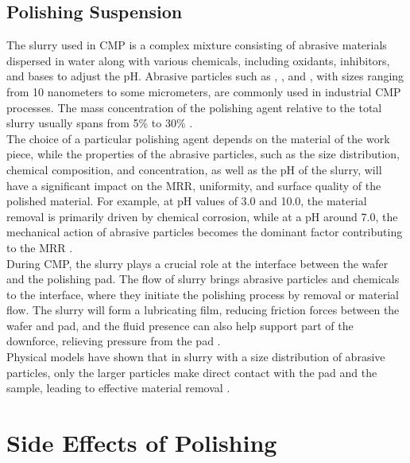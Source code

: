 \subsection{Polishing Suspension}
\label{subsec:polishing_slurry}

The slurry used in CMP is a complex mixture consisting of abrasive materials dispersed in water along with various chemicals, including oxidants, inhibitors, and bases to adjust the pH. Abrasive particles such as , , and , with sizes ranging from 10 nanometers to some micrometers, are commonly used in industrial CMP processes. The mass concentration of the polishing agent relative to the total slurry usually spans from 5\% to 30\% \cite{bliedtnerOptiktechnologieGrundlagenVerfahrenAnwendungenBeispieleOptical2010}.
\\
The choice of a particular polishing agent depends on the material of the work piece, while the properties of the abrasive particles, such as the size distribution, chemical composition, and concentration, as well as the pH of the slurry, will have a significant impact on the MRR, uniformity, and surface quality of the polished material. For example, at pH values of 3.0 and 10.0, the material removal is primarily driven by chemical corrosion, while at a pH around 7.0, the mechanical action of abrasive particles becomes the dominant factor contributing to the MRR \cite{liang-yongEffectChemicalsChemical2007}.
\\
During CMP, the slurry plays a crucial role at the interface between the wafer and the polishing pad. The flow of slurry brings abrasive particles and chemicals to the interface, where they initiate the polishing process by removal or material flow. The slurry will form a lubricating film, reducing friction forces between the wafer and pad, and the fluid presence can also help support part of the downforce, relieving pressure from the pad \cite{zhaoChemicalMechanicalPolishing2013}.
\\
Physical models have shown that in slurry with a size distribution of abrasive particles, only the larger particles make direct contact with the pad and the sample, leading to effective material removal \cite{liang-yongEffectChemicalsChemical2007}. 

\section{Side Effects of Polishing}
\label{sec:polishing_side_eff}

